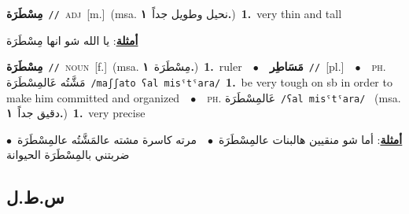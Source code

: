 \documentclass[10pt,a4paper,twoside]{article} %
\begin{document}
\begin{multicols}{2}
{\setlength\topsep{0pt}\textbf{\foreignlanguage{arabic}{مِسْطَرَة}}\ {\color{gray}\texttt{//}\color{black}}\ \textsc{adj}\ [m.]\ \color{gray}(msa. \foreignlanguage{arabic}{نحيل وطويل جداً}~\foreignlanguage{arabic}{\textbf{١.}})\color{black}\ \textbf{1.}~very thin and tall\  \begin{flushright}\color{gray}\foreignlanguage{arabic}{\textbf{\underline{\foreignlanguage{arabic}{أمثلة}}}: يا الله شو انها مِسْطَرَة}\end{flushright}\color{black}} \vspace{2mm}

{\setlength\topsep{0pt}\textbf{\foreignlanguage{arabic}{مِسْطَرَة}}\ {\color{gray}\texttt{//}\color{black}}\ \textsc{noun}\ [f.]\ \color{gray}(msa. \foreignlanguage{arabic}{مِسْطَرَة}~\foreignlanguage{arabic}{\textbf{١.}})\color{black}\ \textbf{1.}~ruler\ \ $\bullet$\ \ \setlength\topsep{0pt}\textbf{\foreignlanguage{arabic}{مَسَاطِر}}\ {\color{gray}\texttt{//}\color{black}}\ [pl.]\ \ $\bullet$\ \ \textsc{ph.} \color{gray} \foreignlanguage{arabic}{مَشَّتُه عَالمِسْطَرَة}\color{black}\ {\color{gray}\texttt{/{\sffamily maʃʃato ʕal misˤtˤara}/}\color{black}}\ \textbf{1.}~be very tough on sb in order to make him committed and organized\ \ $\bullet$\ \ \textsc{ph.} \color{gray} \foreignlanguage{arabic}{عَالمِسْطَرَة}\color{black}\ {\color{gray}\texttt{/{\sffamily ʕal misˤtˤara}/}\color{black}}\ \color{gray} (msa. \foreignlanguage{arabic}{دقيق جداً}~\foreignlanguage{arabic}{\textbf{١.}})\color{black}\ \textbf{1.}~very precise\  \begin{flushright}\color{gray}\foreignlanguage{arabic}{\textbf{\underline{\foreignlanguage{arabic}{أمثلة}}}: أما شو منقيين هالبنات عالمِسْطَرَة\ $\bullet$\ \  مرته كاسرة مشته عالمَشَّتُه عالمِسْطَرَة\ $\bullet$\ \  ضربتني بالمِسْطَرَة الحيوانة}\end{flushright}\color{black}} \vspace{2mm}

\vspace{-3mm}
\subsection*{\color{blue}\foreignlanguage{arabic}{س.ط.ل}\color{blue}{}} 


\end{multicols}
\end{document}

